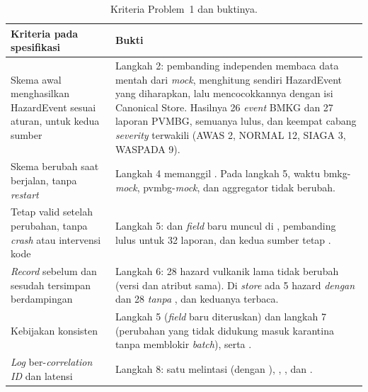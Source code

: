 \begin{table}[H]
\centering\small
\begin{tabularx}{\textwidth}{@{}L{4.6cm}Y@{}}
\toprule
\textbf{Kriteria pada spesifikasi} & \textbf{Bukti}\\
\midrule
Skema awal menghasilkan HazardEvent sesuai aturan, untuk kedua sumber & Langkah 2: pembanding independen membaca data mentah dari \emph{mock}, menghitung sendiri HazardEvent yang diharapkan, lalu mencocokkannya dengan isi Canonical Store. Hasilnya 26 \emph{event} BMKG dan 27 laporan PVMBG, semuanya lulus, dan keempat cabang \emph{severity} terwakili (AWAS 2, NORMAL 12, SIAGA 3, WASPADA 9).\\
Skema berubah saat berjalan, tanpa \emph{restart} & Langkah 4 memanggil . Pada langkah 5, waktu  bmkg-\emph{mock}, pvmbg-\emph{mock}, dan aggregator tidak berubah.\\
Tetap valid setelah perubahan, tanpa \emph{crash} atau intervensi kode & Langkah 5:  dan \emph{field} baru  muncul di , pembanding lulus untuk 32 laporan, dan kedua sumber tetap .\\
\emph{Record} sebelum dan sesudah tersimpan berdampingan & Langkah 6: 28 hazard vulkanik lama tidak berubah (versi dan atribut sama). Di \emph{store} ada 5 hazard \emph{dengan} dan 28 \emph{tanpa} , dan keduanya terbaca.\\
Kebijakan konsisten & Langkah 5 (\emph{field} baru diteruskan) dan langkah 7 (perubahan yang tidak didukung masuk karantina tanpa memblokir \emph{batch}), serta .\\
\emph{Log} ber-\emph{correlation ID} dan latensi & Langkah 8: satu  melintasi  (dengan ), , , dan .\\
\bottomrule
\end{tabularx}
\caption{Kriteria Problem~1 dan buktinya.}
\end{table}

